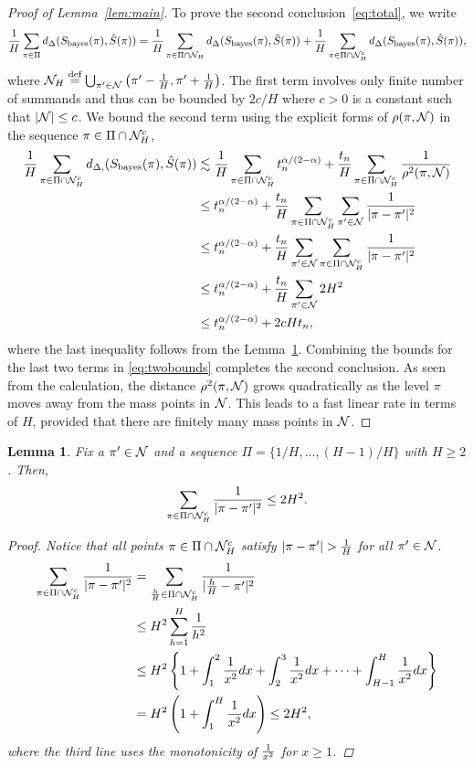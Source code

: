 \documentclass[11pt]{article}
\theoremstyle{plain}
\newtheorem{lem}{Lemma}
\theoremstyle{definition}
\def\bayesS{S_{\textup{bayes}}}
\begin{document}
\begin{proof}[Proof of Lemma~\ref{lem:main}]
To prove the second conclusion~\eqref{eq:total}, we write 
\begin{align}\label{eq:twobounds}
{1\over H}\sum_{\pi \in \Pi} d_{\Delta}(\bayesS(\pi),\hat S(\pi))={1\over H}\sum_{\pi \in \Pi\cap \tN_H} d_{\Delta}(\bayesS(\pi),\hat S(\pi))+{1\over H}\sum_{\pi \in \Pi\cap \tN_H^c} d_{\Delta}(\bayesS(\pi),\hat S(\pi)),
\end{align}
where $\mathcal{N}_H \stackrel{\text{def}}{=}\bigcup_{\pi'\in\mathcal{N}}\left(\pi'-\frac{1}{H},\pi'+\frac{1}{H}\right)$.
The first term involves only finite number of summands and thus can be bounded by $2c/H$ where $c>0$ is a constant such that $|\mathcal{N}|\leq c$.  We bound the second term using the explicit forms of $\rho(\pi, \mathcal{N})$ in the sequence $\pi \in\Pi\cap \mathcal{N}_H^c$,
\begin{align}
{1\over H}\sum_{\pi \in \Pi\cap \tN_H^c} d_{\Delta,}(\bayesS(\pi),\hat S(\pi)) &\lesssim  {1\over H}\sum_{\pi\in \Pi\cap \tN_H^c} t_n^{\alpha/(2-\alpha)}+{t_n\over H}\sum_{\pi \in \Pi\cap \tN_H^c}{1\over \rho^2(\pi, \tN)}\\
&\leq t_n^{\alpha/(2-\alpha)}+{t_n\over H} \sum_{\pi \in \Pi\cap \tN_H^c} \sum_{\pi' \in \tN}{1\over |\pi-\pi'|^2}\\
&\leq  t_n^{\alpha/(2-\alpha)}+{t_n\over H} \sum_{\pi'\in \tN} \sum_{\pi \in \Pi\cap \tN_H^c}{1\over |\pi-\pi'|^2}\\
&\leq t_n^{\alpha/(2-\alpha)}+ {t_n\over H} \sum_{\pi'\in \tN} 2H^2\\
&\leq t_n^{\alpha/(2-\alpha)}+ 2cHt_n,
\end{align}
where the last inequality follows from the Lemma~\ref{lem:H}.  Combining the bounds for the last two terms in \eqref{eq:twobounds} completes the second conclusion.  As seen from the calculation, the distance $\rho^2(\pi, \mathcal{N})$ grows quadratically as the level $\pi$ moves away from the mass points in $\mathcal{N}$. This leads to a fast linear rate in terms of $H$, provided that there are finitely many mass points in $\mathcal{N}$.
\end{proof}

\begin{lem}\label{lem:H}
Fix a $\pi'\in\mathcal{N}$ and a sequence $\Pi=\{1/H,\ldots,(H-1)/H\}$ with $H\geq 2$. Then, 
\[
\sum_{\pi \in \Pi\cap \mathcal{N}_H^c}{1\over 
|\pi-\pi'|^2}\leq 2H^2. 
\]
\begin{proof}
Notice that  all points $\pi\in\Pi\cap\mathcal{N}_H^c$ satisfy 
$|\pi-\pi'|>{1\over H}$ for all $\pi'\in\mathcal{N}$.
\begin{align}
   \sum_{\pi \in \Pi\cap \mathcal{N}_H^c}{1\over |\pi-\pi'|^2}&= \sum_{\frac{h}{H}\in\Pi\cap \mathcal{N}_H^c } {1\over |\frac{h}{H}-\pi'|^2}\\
   &\leq H^2 \sum_{h=1}^{H}{1 \over h^2}\\
 &\leq H^2\left\{ 1+\int_{1}^2{1\over x^2}dx+ \int_{2}^3{1\over x^2}dx+\cdots + \int_{H-1}^H{1\over x^2}dx\right\}\\
&= H^2\left(1+\int^{H}_{1}{1\over x^2}dx\right) \leq 2H^2,
\end{align}
 where the third line uses the monotonicity of ${1\over x^2}$ for $x\geq 1$. 
 \end{proof}
\end{lem}
\end{document}
